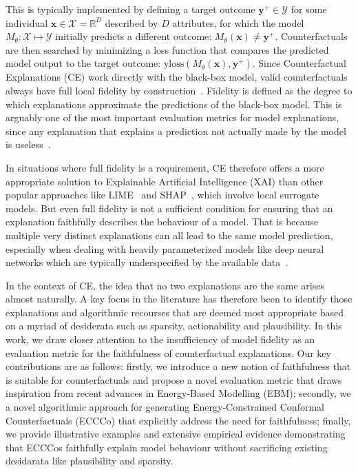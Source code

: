 \documentclass{article}
\begin{document}
This is typically implemented by defining a target outcome $\mathbf{y}^+ \in \mathcal{Y}$ for some individual $\mathbf{x} \in \mathcal{X}=\mathbb{R}^D$ described by $D$ attributes, for which the model $M_{\theta}:\mathcal{X}\mapsto\mathcal{Y}$ initially predicts a different outcome: $M_{\theta}(\mathbf{x})\ne \mathbf{y}^+$. Counterfactuals are then searched by minimizing a loss function that compares the predicted model output to the target outcome: $\text{yloss}(M_{\theta}(\mathbf{x}),\mathbf{y}^+)$. Since Counterfactual Explanations (CE) work directly with the black-box model, valid counterfactuals always have full local fidelity by construction~\citep{mothilal2020explaining}. Fidelity is defined as the degree to which explanations approximate the predictions of the black-box model. This is arguably one of the most important evaluation metrics for model explanations, since any explanation that explains a prediction not actually made by the model is useless~\citep{molnar2020interpretable}. 

In situations where full fidelity is a requirement, CE therefore offers a more appropriate solution to Explainable Artificial Intelligence (XAI) than other popular approaches like LIME~\citep{ribeiro2016why} and SHAP~\citep{lundberg2017unified}, which involve local surrogate models. But even full fidelity is not a sufficient condition for ensuring that an explanation faithfully describes the behaviour of a model. That is because multiple very distinct explanations can all lead to the same model prediction, especially when dealing with heavily parameterized models like deep neural networks which are typically underspecified by the available data~\citep{wilson2020case}.

In the context of CE, the idea that no two explanations are the same arises almost naturally. A key focus in the literature has therefore been to identify those explanations and algorithmic recourses that are deemed most appropriate based on a myriad of desiderata such as sparsity, actionability and plausibility. In this work, we draw closer attention to the insufficiency of model fidelity as an evaluation metric for the faithfulness of counterfactual explanations. Our key contributions are as follows: firstly, we introduce a new notion of faithfulness that is suitable for counterfactuals and propose a novel evaluation metric that draws inspiration from recent advances in Energy-Based Modelling (EBM); secondly, we a novel algorithmic approach for generating Energy-Constrained Conformal Counterfactuals (ECCCo) that explicitly address the need for faithfulness; finally, we provide illustrative examples and extensive empirical evidence demonstrating that ECCCos faithfully explain model behaviour without sacrificing existing desidarata like plausibility and sparsity. 
\end{document}
